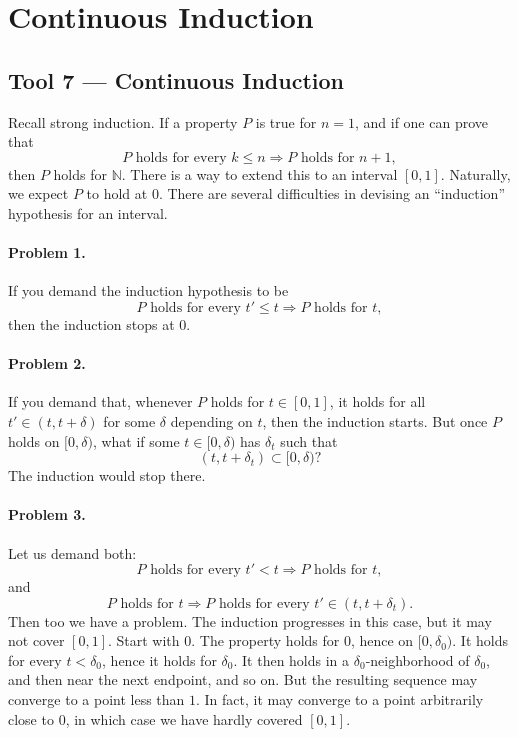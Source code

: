 \documentclass[11pt,a4paper]{article}
\begin{document}
\section*{Continuous Induction}
\subsection*{Tool 7 — Continuous Induction}
Recall strong induction. If a property $P$ is true for $n=1$, and if one can prove that
\[
P\text{ holds for every }k\leq n
\Longrightarrow P\text{ holds for }n+1,
\]
then $P$ holds for $\mathbb N$. There is a way to extend this to an interval $[0,1]$. Naturally, we expect $P$ to hold at $0$. There are several difficulties in devising an ``induction'' hypothesis for an interval.


\paragraph{Problem 1.}
If you demand the induction hypothesis to be
\[
P\text{ holds for every }t'\leq t
\Longrightarrow P\text{ holds for }t,
\]
then the induction stops at $0$.

\paragraph{Problem 2.}
If you demand that, whenever $P$ holds for $t\in[0,1]$, it holds for all \(t'\in(t,t+\delta)\)
for some $\delta$ depending on $t$, then the induction starts. But once $P$ holds on $[0,\delta)$, what if some $t\in[0,\delta)$ has $\delta_t$ such that
\[
(t,t+\delta_t)\subset[0,\delta)?
\]
The induction would stop there.


\paragraph{Problem 3.}
Let us demand both:
\[
P\text{ holds for every }t'<t
\Longrightarrow P\text{ holds for }t,
\]
and
\[
P\text{ holds for }t
\Longrightarrow
P\text{ holds for every }t'\in(t,t+\delta_t).
\]
Then too we have a problem. The induction progresses in this case, but it may not cover $[0,1]$. Start with $0$. The property holds for $0$, hence on $[0,\delta_0)$. It holds for every $t<\delta_0$, hence it holds for $\delta_0$. It then holds in a $\delta_0$-neighborhood of $\delta_0$, and then near the next endpoint, and so on. But the resulting sequence may converge to a point less than $1$. In fact, it may converge to a point arbitrarily close to $0$, in which case we have hardly covered $[0,1]$.
\end{document}
